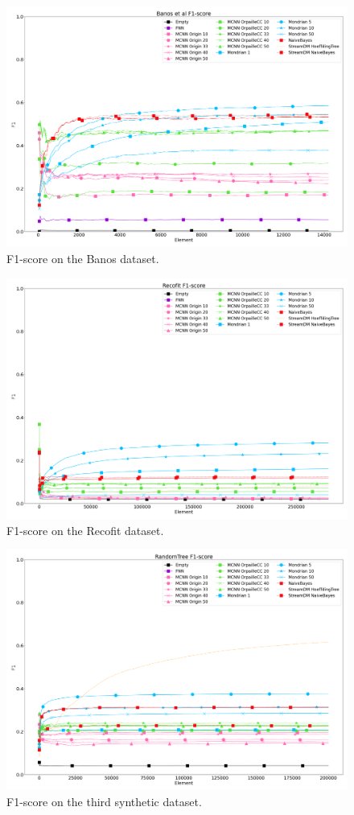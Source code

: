 \begin{figure}[H]
	\includegraphics[width=\linewidth]{figures/results/banos_f1.png}
	\caption{F1-score on the Banos dataset.}
\end{figure}
\begin{figure}[H]
	\includegraphics[width=\linewidth]{figures/results/recofit_f1.png}
	\caption{F1-score on the Recofit dataset.}
\end{figure}
\begin{figure}[H]
	\includegraphics[width=\linewidth]{figures/results/dataset_3_f1.png}
	\caption{F1-score on the third synthetic dataset.}
\end{figure}
